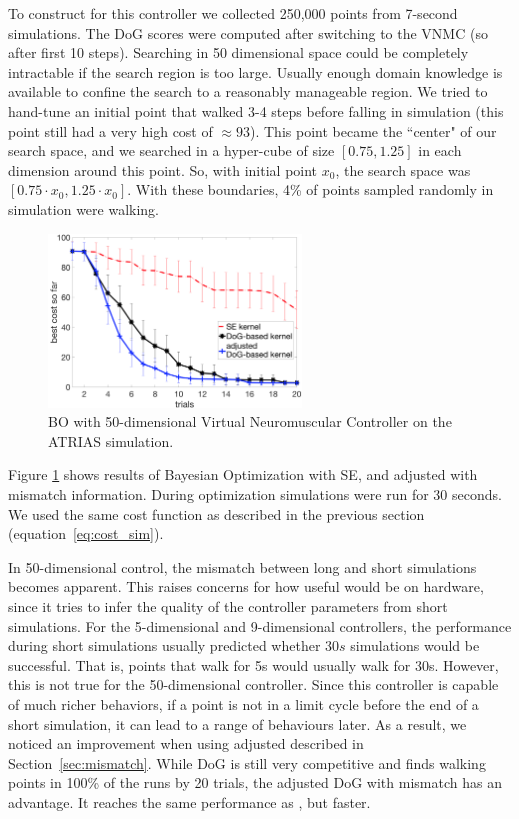 To construct \dogkernel for this controller we collected 250,000 points from 7-second simulations. The DoG scores were computed after switching to the VNMC (so after first 10 steps). Searching in 50 dimensional space could be completely intractable if the search region is too large. Usually enough domain knowledge is available to confine the search to a reasonably manageable region. We tried to hand-tune an initial point that walked 3-4 steps before falling in simulation (this point still had a very high cost of $\approx\!\!93$). This point became the ``center" of our search space, and we searched in a hyper-cube of size $[0.75, 1.25]$ in each dimension around this point. So, with initial point $x_0$, the search space was $[0.75 \cdot x_0 , 1.25 \cdot x_0]$. With these boundaries, 4\% of points sampled randomly in simulation were walking.

\begin{figure}[t]
\centering
\includegraphics[width=0.6\textwidth]{img/sim_NM_Atrias_50d.png}
\caption{\small{BO with 50-dimensional Virtual Neuromuscular Controller on the ATRIAS simulation.}}
\label{fig:sim_NM_Atrias_50d}
\end{figure}

Figure \ref{fig:sim_NM_Atrias_50d} shows results of Bayesian Optimization with SE, \dogkernel and adjusted \dogkernel with mismatch information. During optimization simulations were run for $30$ seconds. We used the same cost function as described in the previous section (equation~\ref{eq:cost_sim}).

In 50-dimensional control, the mismatch between long and short simulations becomes apparent. This raises concerns for how useful \dogkernel would be on hardware, since it tries to infer the quality of the controller parameters from short simulations. 
For the 5-dimensional and 9-dimensional controllers, the performance during short simulations usually predicted whether $30s$ simulations would be successful. That is, points that walk for 5s would usually walk for 30s. However, this is not true for the 50-dimensional controller. Since this controller is capable of much richer behaviors, if a point is not in a limit cycle before the end of a short simulation, it can lead to a range of behaviours later. As a result, we noticed an improvement when using adjusted \dogkernel described in Section~\ref{sec:mismatch}. While DoG is still very competitive and finds walking points in 100\% of the runs by 20 trials, the adjusted DoG with mismatch has an advantage. It reaches the same performance as \dogkernel, but faster. 


